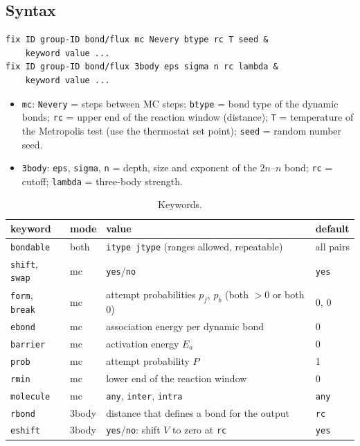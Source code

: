 \documentclass[a4paper]{tufte-handout}
\newcommand{\cmd}[1]{\texttt{#1}}
\begin{document}
\subsection{Syntax}
\begin{lstlisting}
fix ID group-ID bond/flux mc Nevery btype rc T seed &
    keyword value ...
fix ID group-ID bond/flux 3body eps sigma n rc lambda &
    keyword value ...
\end{lstlisting}
\begin{itemize}
\item \cmd{mc}: \cmd{Nevery} = steps between MC steps; \cmd{btype} = bond type of the dynamic bonds;
  \cmd{rc} = upper end of the reaction window (distance); \cmd{T} = temperature of the Metropolis
  test (use the thermostat set point); \cmd{seed} = random number seed.
\item \cmd{3body}: \cmd{eps}, \cmd{sigma}, \cmd{n} = depth, size and exponent of the $2n$--$n$ bond;
  \cmd{rc} = cutoff; \cmd{lambda} = three-body strength.
\end{itemize}

\begin{table}[htp]
\footnotesize
\begin{tabular}{@{}llP{50mm}l@{}}
\toprule
keyword & mode & value & default \\
\midrule
\cmd{bondable} & both & \cmd{itype jtype} (ranges allowed, repeatable) & all pairs \\
\cmd{shift}, \cmd{swap} & mc & \cmd{yes}/\cmd{no} & \cmd{yes} \\
\cmd{form}, \cmd{break} & mc & attempt probabilities $p_f$, $p_b$ (both $>0$ or both 0) & 0, 0 \\
\cmd{ebond} & mc & association energy per dynamic bond & 0 \\
\cmd{barrier} & mc & activation energy $E_a$ & 0 \\
\cmd{prob} & mc & attempt probability $P$ & 1 \\
\cmd{rmin} & mc & lower end of the reaction window & 0 \\
\cmd{molecule} & mc & \cmd{any}, \cmd{inter}, \cmd{intra} & \cmd{any} \\
\cmd{rbond} & 3body & distance that defines a bond for the output & \cmd{rc} \\
\cmd{eshift} & 3body & \cmd{yes}/\cmd{no}: shift $V$ to zero at \cmd{rc} & \cmd{yes} \\
\bottomrule
\end{tabular}
\caption{Keywords.}\label{tab:keywords}
\end{table}
\end{document}
